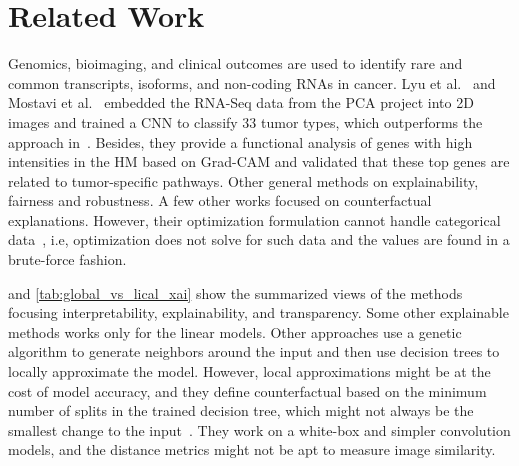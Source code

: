 \section{Related Work}\label{chapter_5:rw}
Genomics, bioimaging, and clinical outcomes are used to identify rare and common transcripts, isoforms, and non-coding RNAs in cancer. 
Lyu et al.~\cite{lyu2018deep} and Mostavi et al.~\cite{mostavi2019convolutional} embedded the RNA-Seq data from the PCA project into 2D images and trained a CNN to classify 33 tumor types, which outperforms the approach in~\cite{li2017comprehensive}. Besides, they provide a functional analysis of genes with high intensities in the HM based on Grad-CAM and validated that these top genes are related to tumor-specific pathways. Other general methods on explainability, fairness and robustness. 
A few other works focused on counterfactual explanations. However, their optimization formulation cannot handle categorical data~\cite{ying2019gnnexplainer}, i.e, optimization does not solve for such data and the values are found in a brute-force fashion.

\hspace*{3.5mm}  and \cref{tab:global_vs_lical_xai} show the summarized views of the methods focusing interpretability, explainability, and transparency. Some other explainable methods works only for the linear models. Other approaches use a genetic algorithm to generate neighbors around the input and then use decision trees to locally approximate the model. However, local approximations might be at the cost of model accuracy, and they define counterfactual based on the minimum number of splits in the trained decision tree, which might not always be the smallest change to the input~\cite{li2017comprehensive}. They work on a white-box and simpler convolution models, and the distance metrics might not be apt to measure image similarity. 

